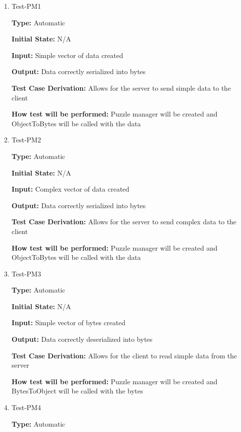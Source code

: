 \documentclass[12pt, titlepage]{article}
\begin{document}
\begin{enumerate}

 \item{Test-PM1\\}

 \textbf{Type:} Automatic
					
 \textbf{Initial State:} N/A
					
 \textbf{Input:} Simple vector of data created
					
 \textbf{Output:} Data correctly serialized into bytes

 \textbf{Test Case Derivation:} Allows for the server to send simple data to the client

 \textbf{How test will be performed:} Puzzle manager will be created and ObjectToBytes will be called with the data

 \item{Test-PM2\\}

 \textbf{Type:} Automatic
					
 \textbf{Initial State:} N/A
					
 \textbf{Input:} Complex vector of data created
					
 \textbf{Output:} Data correctly serialized into bytes

 \textbf{Test Case Derivation:} Allows for the server to send complex data to the client

 \textbf{How test will be performed:} Puzzle manager will be created and ObjectToBytes will be called with the data

 \item{Test-PM3\\}

 \textbf{Type:} Automatic
					
 \textbf{Initial State:} N/A
					
 \textbf{Input:} Simple vector of bytes created
					
 \textbf{Output:} Data correctly deserialized into bytes

 \textbf{Test Case Derivation:} Allows for the client to read simple data from the server

 \textbf{How test will be performed:} Puzzle manager will be created and BytesToObject will be called with the bytes

  \item{Test-PM4\\}

 \textbf{Type:} Automatic
					

\end{enumerate}
\end{document}
